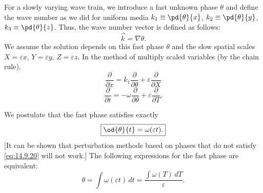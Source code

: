 For a slowly varying wave train, we introduce a fast unknown phase $\theta$ and define the wave number as we did for uniform media $k_1 \equiv \pd{\theta}{x}$, $k_2 \equiv \pd{\theta}{y}$, $k_3 \equiv \pd{\theta}{z}$. Thus, the wave number vector is defined as follows:
\begin{equation}
\boxed{\vec{k} = \nabla\theta.}
\label{eq:14.9.50}
\end{equation}
We assume the solution depends on this fast phase $\theta$ and the slow spatial scales $X = \varepsilon x$, $Y = \varepsilon y$, $Z = \varepsilon z$. In the method of multiply scaled variables (by the chain rule),
\begin{equation}
\frac{\partial}{\partial x} = k_1\frac{\partial}{\partial \theta} + \varepsilon\frac{\partial}{\partial X}
\label{eq:14.9.67}
\end{equation}
\begin{equation}
\frac{\partial}{\partial t} = -\omega\frac{\partial}{\partial \theta} + \varepsilon\frac{\partial}{\partial T}.
\label{eq:14.9.68}
\end{equation}

We postulate that the fast phase satisfies exactly
\begin{equation}
\boxed{\od{\theta}{t} = \omega(\varepsilon t).}
\label{eq:14.9.20}
\end{equation}
[It can be shown that perturbation methods based on phases that do not satisfy \eqref{eq:14.9.20} will not work.] The following expressions for the fast phase are equivalent:
\begin{equation}
\boxed{\theta = \int\omega(\varepsilon t)\,dt = \frac{\int\omega(T)\,dT}{\varepsilon}.}
\label{eq:14.9.21}
\end{equation}

